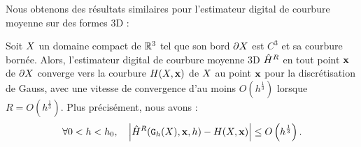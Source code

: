 %
Nous obtenons des résultats similaires pour l'estimateur digital de courbure
moyenne sur des formes 3D :
%
\begin{theorem}
  \label{thm:convergence-curv-3d}
  Soit $X$ un domaine compact de $\mathbb{R}^3$ tel que son bord $\partial X$ est $C^3$ et
  sa courbure bornée. Alors, l'estimateur digital de courbure moyenne 3D
  $\hat{H}^{R}$ en tout point $\mathbf{x}$ de $\partial X$ converge vers la
  courbure $H(X,\mathbf{x})$ de $X$ au point $\mathbf{x}$ pour la
  discrétisation de Gauss, avec une vitesse de convergence d'au moins
  $O(h^{\frac{1}{3}})$ lorsque $R = O(h^{\frac{1}{3}})$. Plus précisément, nous
  avons :
  \begin{equation}
    \forall 0 < h < h_0,
    \quad \left | \MeanCurvH{R}(\DSh, \vx, h) - \MeanCurv(\Shape, \vx) \right|
                          \le O \left(h^{\frac{1}{3}}\right). %
  \end{equation}
\end{theorem}
